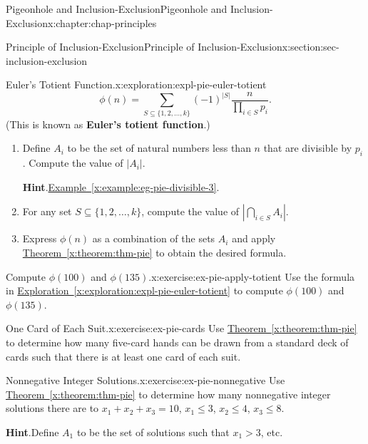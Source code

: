 \documentclass[oneside,10pt,]{book}
\newcommand{\blocktitlefont}{\relax}
\newcommand{\xreffont}{\relax}
\newcommand{\terminology}[1]{\textbf{#1}}
\numberwithin{equation}{section}
\begin{document}
\begin{chapterptx}{Pigeonhole and Inclusion-Exclusion}{}{Pigeonhole and Inclusion-Exclusion}{}{}{x:chapter:chap-principles}
\begin{sectionptx}{Principle of Inclusion-Exclusion}{}{Principle of Inclusion-Exclusion}{}{}{x:section:sec-inclusion-exclusion}
\begin{exploration}{Euler's Totient Function.}{x:exploration:expl-pie-euler-totient}
\begin{equation*}
\phi(n) = \sum_{S \subseteq \{1,2,\ldots,k\}}(-1)^{|S|}\dfrac{n}{\prod_{i\in S} p_i}\text{.}
\end{equation*}
(This is known as \terminology{Euler's totient function}.)%
\begin{enumerate}[font=\bfseries,label=(\alph*),ref=\alph*]
\item{}Define \(A_i\) to be the set of natural numbers less than \(n\) that are divisible by \(p_i\). Compute the value of \(|A_i|\).%
\par\smallskip%
\noindent\textbf{\blocktitlefont Hint}.\hypertarget{g:hint:id434958}{}\quad{}\hyperref[x:example:eg-pie-divisible-3]{Example~{\xreffont\ref{x:example:eg-pie-divisible-3}}}.%
\item{}For any set \(S \subseteq \{1,2,\ldots,k\}\), compute the value of \(\left|\displaystyle\bigcap_{i\in S} A_i \right|\).%
\item{}Express \(\phi(n)\) as a combination of the sets \(A_i\) and apply \hyperref[x:theorem:thm-pie]{Theorem~{\xreffont\ref{x:theorem:thm-pie}}} to obtain the desired formula.%
\end{enumerate}
\end{exploration}
\begin{inlineexercise}{Compute \(\phi(100)\) and \(\phi(135)\).}{x:exercise:ex-pie-apply-totient}%
Use the formula in \hyperref[x:exploration:expl-pie-euler-totient]{Exploration~{\xreffont\ref{x:exploration:expl-pie-euler-totient}}} to compute \(\phi(100)\) and \(\phi(135)\).%
\end{inlineexercise}
\begin{inlineexercise}{One Card of Each Suit.}{x:exercise:ex-pie-cards}%
Use \hyperref[x:theorem:thm-pie]{Theorem~{\xreffont\ref{x:theorem:thm-pie}}} to determine how many five-card hands can be drawn from a standard deck of cards such that there is at least one card of each suit.%
\end{inlineexercise}
\begin{inlineexercise}{Nonnegative Integer Solutions.}{x:exercise:ex-pie-nonnegative}%
Use \hyperref[x:theorem:thm-pie]{Theorem~{\xreffont\ref{x:theorem:thm-pie}}} to determine how many nonnegative integer solutions there are to \(x_1 + x_2 + x_3 = 10\), \(x_1 \leq 3\), \(x_2 \leq 4\), \(x_3 \leq 8\).%
\par\smallskip%
\noindent\textbf{\blocktitlefont Hint}.\hypertarget{g:hint:id435444}{}\quad{}Define \(A_1\) to be the set of solutions such that \(x_1 > 3\), etc.%
\end{inlineexercise}
\end{sectionptx}

\end{chapterptx}
\end{document}
